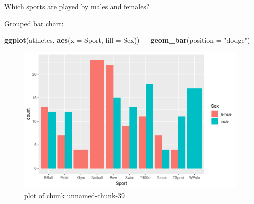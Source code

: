 \documentclass[ignorenonframetext,]{beamer}
\newenvironment{Shaded}{\begin{snugshade}}{\end{snugshade}}
\newcommand{\DataTypeTok}[1]{\textcolor[rgb]{0.13,0.29,0.53}{#1}}
\newcommand{\KeywordTok}[1]{\textcolor[rgb]{0.13,0.29,0.53}{\textbf{#1}}}
\newcommand{\NormalTok}[1]{#1}
\newcommand{\OperatorTok}[1]{\textcolor[rgb]{0.81,0.36,0.00}{\textbf{#1}}}
\newcommand{\StringTok}[1]{\textcolor[rgb]{0.31,0.60,0.02}{#1}}
\begin{document}
\begin{frame}[fragile]{Which sports are played by males and females?}
\protect\hypertarget{which-sports-are-played-by-males-and-females}{}

Grouped bar chart:

\begin{Shaded}
\begin{Highlighting}[]
\KeywordTok{ggplot}\NormalTok{(athletes, }\KeywordTok{aes}\NormalTok{(}\DataTypeTok{x =}\NormalTok{ Sport, }\DataTypeTok{fill =}\NormalTok{ Sex)) }\OperatorTok{+}
\StringTok{  }\KeywordTok{geom_bar}\NormalTok{(}\DataTypeTok{position =} \StringTok{"dodge"}\NormalTok{)}
\end{Highlighting}
\end{Shaded}

\begin{figure}
\centering
\includegraphics{figure/unnamed-chunk-39-1.png}
\caption{plot of chunk unnamed-chunk-39}
\end{figure}

\end{frame}
\end{document}
